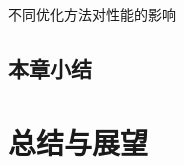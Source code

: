 \documentclass[degree=doctor]{thuthesis}
\begin{document}
不同优化方法对性能的影响

\section{本章小结}

\chapter{总结与展望} %
\label{ch:总结与展望}


%
%


\backmatter




% 





%



%
\end{document}
